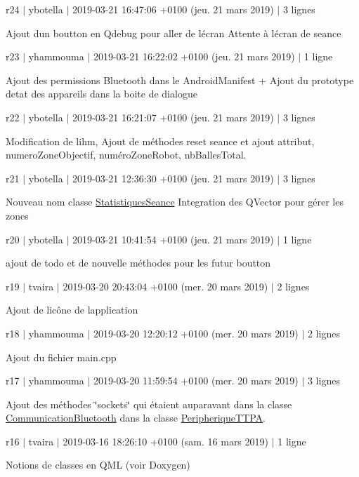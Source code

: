 r24 $\vert$ ybotella $\vert$ 2019-\/03-\/21 16\+:47\+:06 +0100 (jeu. 21 mars 2019) $\vert$ 3 lignes

Ajout d\textquotesingle{}un boutton en Qdebug pour aller de l\textquotesingle{}écran Attente à l\textquotesingle{}écran de seance

r23 $\vert$ yhammouma $\vert$ 2019-\/03-\/21 16\+:22\+:02 +0100 (jeu. 21 mars 2019) $\vert$ 1 ligne

Ajout des permissions Bluetooth dans le Android\+Manifest + Ajout du prototype d\textquotesingle{}etat des appareils dans la boite de dialogue

r22 $\vert$ ybotella $\vert$ 2019-\/03-\/21 16\+:21\+:07 +0100 (jeu. 21 mars 2019) $\vert$ 3 lignes

Modification de l\textquotesingle{}ihm, Ajout de méthodes reset seance et ajout attribut, numero\+Zone\+Objectif, numéro\+Zone\+Robot, nb\+Balles\+Total.

r21 $\vert$ ybotella $\vert$ 2019-\/03-\/21 12\+:36\+:30 +0100 (jeu. 21 mars 2019) $\vert$ 3 lignes

Nouveau nom classe \hyperlink{class_statistiques_seance}{Statistiques\+Seance} Integration des Q\+Vector pour gérer les zones

r20 $\vert$ ybotella $\vert$ 2019-\/03-\/21 10\+:41\+:54 +0100 (jeu. 21 mars 2019) $\vert$ 1 ligne

ajout de todo et de nouvelle méthodes pour les futur boutton

r19 $\vert$ tvaira $\vert$ 2019-\/03-\/20 20\+:43\+:04 +0100 (mer. 20 mars 2019) $\vert$ 2 lignes

Ajout de l\textquotesingle{}icône de l\textquotesingle{}application

r18 $\vert$ yhammouma $\vert$ 2019-\/03-\/20 12\+:20\+:12 +0100 (mer. 20 mars 2019) $\vert$ 2 lignes

Ajout du fichier main.\+cpp

r17 $\vert$ yhammouma $\vert$ 2019-\/03-\/20 11\+:59\+:54 +0100 (mer. 20 mars 2019) $\vert$ 3 lignes

Ajout des méthodes \char`\"{}sockets\char`\"{} qui étaient auparavant dans la classe \hyperlink{class_communication_bluetooth}{Communication\+Bluetooth} dans la classe \hyperlink{class_peripherique_t_t_p_a}{Peripherique\+T\+T\+PA}.

r16 $\vert$ tvaira $\vert$ 2019-\/03-\/16 18\+:26\+:10 +0100 (sam. 16 mars 2019) $\vert$ 1 ligne

Notions de classes en Q\+ML (voir Doxygen)

